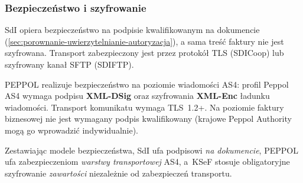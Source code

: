 \subsubsection{Bezpieczeństwo i szyfrowanie}
\label{sec:porownanie-bezpieczenstwo-szyfrowanie}

SdI opiera bezpieczeństwo na podpisie kwalifikowanym na dokumencie (\ref{sec:porownanie-uwierzytelnianie-autoryzacja}), a sama treść faktury nie jest szyfrowana. Transport zabezpieczony jest przez protokół TLS (SDICoop) lub szyfrowany kanał SFTP (SDIFTP). \cite{sdi-fatturapa-regole-tecniche,sdi-fatturapa-accreditamento}

PEPPOL realizuje bezpieczeństwo na poziomie wiadomości AS4: profil Peppol AS4 wymaga podpisu \textbf{XML-DSig} oraz szyfrowania \textbf{XML-Enc} ładunku wiadomości. Transport komunikatu wymaga TLS~1.2+. Na poziomie faktury biznesowej nie jest wymagany podpis kwalifikowany (krajowe Peppol Authority mogą go wprowadzić indywidualnie). \cite{peppol-as4-profile}

Zestawiając modele bezpieczeństwa, SdI ufa podpisowi \emph{na dokumencie}, PEPPOL ufa zabezpieczeniom \emph{warstwy transportowej} AS4, a~KSeF stosuje obligatoryjne szyfrowanie \emph{zawartości} niezależnie od zabezpieczeń transportu.
